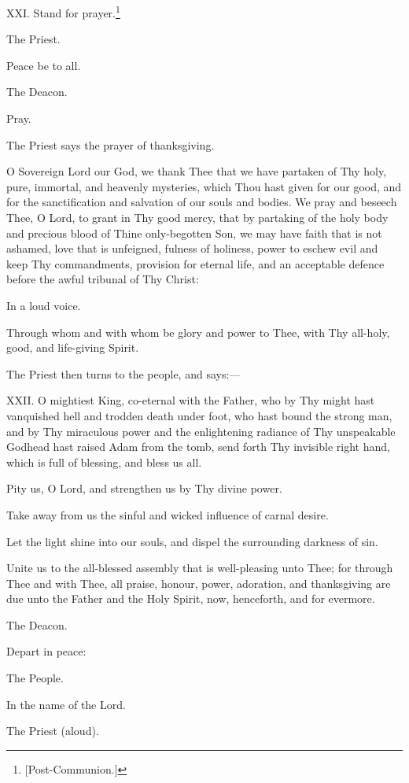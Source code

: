 XXI. Stand for prayer.\footnote{\par{}  [Post-Communion.]}

The Priest.

Peace be to all.

The Deacon.

Pray.

The Priest says the prayer of thanksgiving.

O Sovereign Lord our God, we thank Thee that we have partaken of Thy holy, pure, immortal, and heavenly mysteries, which Thou hast given for our good, and for the sanctification and salvation of our souls and bodies. We pray and beseech Thee, O Lord, to grant in Thy good mercy, that by partaking of the holy body and precious blood of Thine only-begotten Son, we may have faith that is not ashamed, love that is unfeigned, fulness of holiness, power to eschew evil and keep Thy commandments, provision for eternal life, and an acceptable defence before the awful tribunal of Thy Christ:

In a loud voice.

Through whom and with whom be glory and power to Thee, with Thy all-holy, good, and life-giving Spirit.

The Priest then turns to the people, and says:—

XXII. O mightiest King, co-eternal with the Father, who by Thy might hast vanquished hell and trodden death under foot, who hast bound the strong man, and by Thy miraculous power and the enlightening radiance of Thy unspeakable Godhead hast raised Adam from the tomb, send forth Thy invisible right hand, which is full of blessing, and bless us all.

Pity us, O Lord, and strengthen us by Thy divine power.

Take away from us the sinful and wicked influence of carnal desire.

Let the light shine into our souls, and dispel the surrounding darkness of sin.

Unite us to the all-blessed assembly that is well-pleasing unto Thee; for through Thee and with Thee, all praise, honour, power, adoration, and thanksgiving are due unto the Father and the Holy Spirit, now, henceforth, and for evermore.

The Deacon.

Depart in peace:

The People.

In the name of the Lord.

The Priest (aloud).

